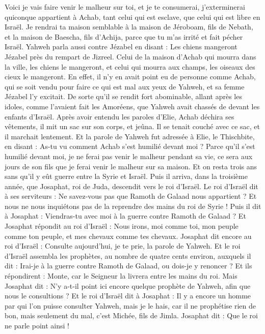 \begin{multicols}{2}
Voici je vais faire venir le malheur sur toi, et je te consumerai, j’exterminerai quiconque appartient à Achab, tant celui qui est esclave, que celui qui est libre en Israël.
Je rendrai ta maison semblable à la maison de Jéroboam, fils de Nebath, et la maison de Baescha, fils d'Achija, parce que tu m'as irrité et fait pécher Israël.
Yahweh parla aussi contre Jézabel en disant : Les chiens mangeront Jézabel près du rempart de Jizreel.
Celui de la maison d’Achab qui mourra dans la ville, les chiens le mangeront, et celui qui mourra aux champs, les oiseaux des cieux le mangeront.
En effet, il n'y en avait point eu de personne comme Achab, qui se soit vendu pour faire ce qui est mal aux yeux de Yahweh, et sa femme Jézabel l’y excitait.
De sorte qu'il se rendit fort abominable, allant après les idoles, comme l'avaient fait les Amoréens, que Yahweh avait chassés de devant les enfants d'Israël.
Après avoir entendu les paroles d’Elie, Achab déchira ses vêtements, il mit un sac sur son corps, et jeûna. Il se tenait couché avec ce sac, et il marchait lentement.
Et la parole de Yahweh fut adressée à Elie, le Thischbite, en disant :
As-tu vu comment Achab s'est humilié devant moi ? Parce qu'il s'est humilié devant moi, je ne ferai pas venir le malheur pendant sa vie, ce sera aux jours de son fils que je ferai venir le malheur sur sa maison.
\VerseOne{}Et on resta trois ans sans qu'il y eût guerre entre la Syrie et Israël.
Puis il arriva, dans la troisième année, que Josaphat, roi de Juda, descendit vers le roi d'Israël.
Le roi d'Israël dit à ses serviteurs : Ne savez-vous pas que Ramoth de Galaad nous appartient ? Et nous ne nous inquiétons pas de la reprendre des mains du roi de Syrie !
Puis il dit à Josaphat : Viendras-tu avec moi à la guerre contre Ramoth de Galaad ? Et Josaphat répondit au roi d'Israël : Nous irons, moi comme toi, mon peuple comme ton peuple, et mes chevaux comme tes chevaux.
Josaphat dit encore au roi d'Israël : Consulte aujourd'hui, je te prie, la parole de Yahweh.
Et le roi d'Israël assembla les prophètes, au nombre de quatre cents environ, auxquels il dit : Irai-je à la guerre contre Ramoth de Galaad, ou dois-je y renoncer ? Et ils répondirent : Monte, car le Seigneur la livrera entre les mains du roi.
Mais Josaphat dit : N'y a-t-il point ici encore quelque prophète de Yahweh, afin que nous le consultions ?
Et le roi d'Israël dit à Josaphat : Il y a encore un homme par qui l’on puisse consulter Yahweh, mais je le hais, car il ne prophétise rien de bon, mais seulement du mal, c'est Michée, fils de Jimla. Josaphat dit : Que le roi ne parle point ainsi !

\end{multicols}

